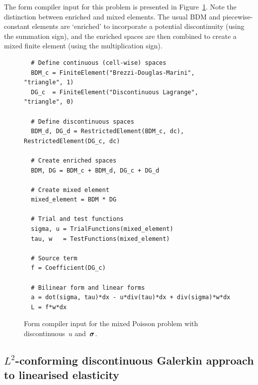 The form compiler input for this problem is presented in
Figure~\ref{nikbakht:code:mixed-Poisson}.  Note the distinction between enriched
and mixed elements.  The usual BDM and piecewise-constant elements are
`enriched' to incorporate a potential discontinuity (using the summation
sign), and the enriched spaces are then combined to create a mixed finite
element (using the multiplication sign).
%
\begin{figure} \footnotesize
\begin{verbatim}
  # Define continuous (cell-wise) spaces
  BDM_c = FiniteElement("Brezzi-Douglas-Marini", "triangle", 1)
  DG_c  = FiniteElement("Discontinuous Lagrange", "triangle", 0)

  # Define discontinuous spaces
  BDM_d, DG_d = RestrictedElement(BDM_c, dc), RestrictedElement(DG_c, dc)

  # Create enriched spaces
  BDM, DG = BDM_c + BDM_d, DG_c + DG_d

  # Create mixed element
  mixed_element = BDM * DG

  # Trial and test functions
  sigma, u = TrialFunctions(mixed_element)
  tau, w   = TestFunctions(mixed_element)

  # Source term
  f = Coefficient(DG_c)

  # Bilinear form and linear forms
  a = dot(sigma, tau)*dx - u*div(tau)*dx + div(sigma)*w*dx
  L = f*w*dx
\end{verbatim}
\caption{Form compiler input for the mixed Poisson problem with
discontinuous~$u$ and~$\boldsymbol{\sigma}$.}
\label{nikbakht:code:mixed-Poisson}
\end{figure}

\subsection{$L^{2}$-conforming discontinuous Galerkin approach to
linearised elasticity}

